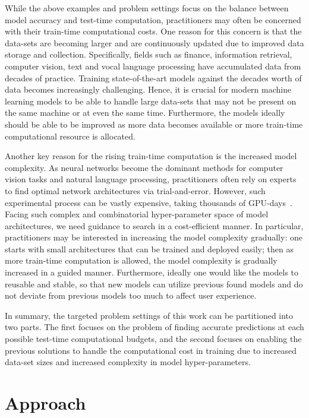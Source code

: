 While the above examples and problem settings focus on the balance between model accuracy and test-time computation, practitioners may often be concerned with their train-time computational costs. 
One reason for this concern is that the data-sets are becoming larger and are continuously updated due to improved data storage and collection. Specifically, fields such as finance, information retrieval, computer vision, text and vocal language processing have accumulated data from decades of practice. Training state-of-the-art models against the decades worth of data becomes increasingly challenging. Hence, it is crucial for modern machine learning models to be able to handle large data-sets that may not be present on the same machine or at even the same time. Furthermore, the models ideally should be able to be improved as more data becomes available or more train-time computational resource is allocated. 

Another key reason for the rising train-time computation is the increased model complexity. As neural networks become the dominant methods for 
computer vision tasks and natural language processing, practitioners often rely on experts to find optimal network architectures via trial-and-error. However, such experimental process can be vastly expensive, taking thousands of GPU-days~\citep{nas}. Facing such complex and combinatorial hyper-parameter space of model architectures, we need guidance to search in a cost-efficient manner. In particular, practitioners may be interested in increasing the model complexity gradually: one starts with small architectures that can be trained and deployed easily; then as more train-time computation is allowed, the model complexity is gradually increased in a guided manner. Furthermore, ideally one would like the models to reusable and stable, so that new models can utilize previous found models and do not deviate from previous models too much to affect user experience. 

In summary, the targeted problem settings of this work can be partitioned into two parts. The first focuses on the problem of finding accurate predictions at each possible test-time computational budgets, and the second focuses on enabling the previous solutions to handle the computational cost in training due to increased data-set sizes and increased complexity in model hyper-parameters. 

\section{Approach}

